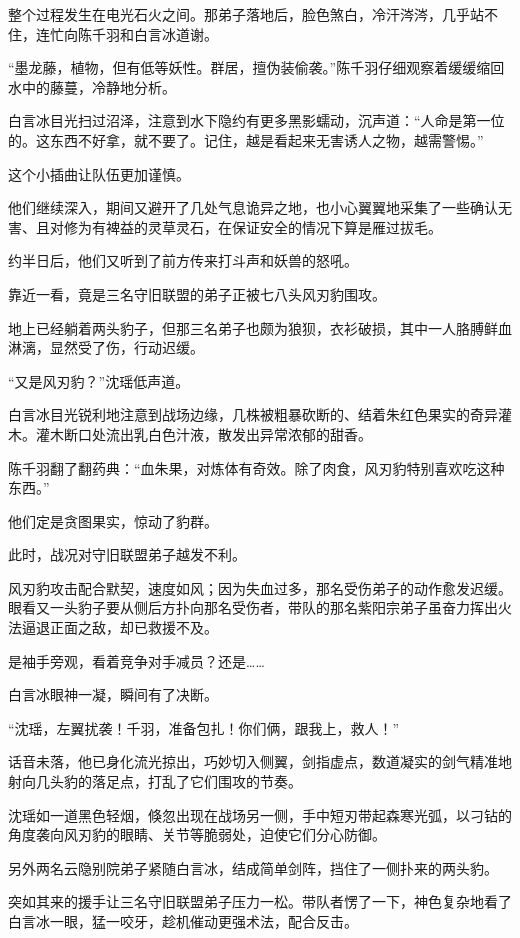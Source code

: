 整个过程发生在电光石火之间。那弟子落地后，脸色煞白，冷汗涔涔，几乎站不住，连忙向陈千羽和白言冰道谢。

“墨龙藤，植物，但有低等妖性。群居，擅伪装偷袭。”陈千羽仔细观察着缓缓缩回水中的藤蔓，冷静地分析。

白言冰目光扫过沼泽，注意到水下隐约有更多黑影蠕动，沉声道：“人命是第一位的。这东西不好拿，就不要了。记住，越是看起来无害诱人之物，越需警惕。”

这个小插曲让队伍更加谨慎。

\vspace{2em}

他们继续深入，期间又避开了几处气息诡异之地，也小心翼翼地采集了一些确认无害、且对修为有裨益的灵草灵石，在保证安全的情况下算是雁过拔毛。

约半日后，他们又听到了前方传来打斗声和妖兽的怒吼。

靠近一看，竟是三名守旧联盟的弟子正被七八头风刃豹围攻。

地上已经躺着两头豹子，但那三名弟子也颇为狼狈，衣衫破损，其中一人胳膊鲜血淋漓，显然受了伤，行动迟缓。

“又是风刃豹？”沈瑶低声道。

白言冰目光锐利地注意到战场边缘，几株被粗暴砍断的、结着朱红色果实的奇异灌木。灌木断口处流出乳白色汁液，散发出异常浓郁的甜香。

陈千羽翻了翻药典：“血朱果，对炼体有奇效。除了肉食，风刃豹特别喜欢吃这种东西。”

他们定是贪图果实，惊动了豹群。

此时，战况对守旧联盟弟子越发不利。

风刃豹攻击配合默契，速度如风；因为失血过多，那名受伤弟子的动作愈发迟缓。眼看又一头豹子要从侧后方扑向那名受伤者，带队的那名紫阳宗弟子虽奋力挥出火法逼退正面之敌，却已救援不及。

是袖手旁观，看着竞争对手减员？还是……

白言冰眼神一凝，瞬间有了决断。

“沈瑶，左翼扰袭！千羽，准备包扎！你们俩，跟我上，救人！”

话音未落，他已身化流光掠出，巧妙切入侧翼，剑指虚点，数道凝实的剑气精准地射向几头豹的落足点，打乱了它们围攻的节奏。

沈瑶如一道黑色轻烟，倏忽出现在战场另一侧，手中短刃带起森寒光弧，以刁钻的角度袭向风刃豹的眼睛、关节等脆弱处，迫使它们分心防御。

另外两名云隐别院弟子紧随白言冰，结成简单剑阵，挡住了一侧扑来的两头豹。

突如其来的援手让三名守旧联盟弟子压力一松。带队者愣了一下，神色复杂地看了白言冰一眼，猛一咬牙，趁机催动更强术法，配合反击。

